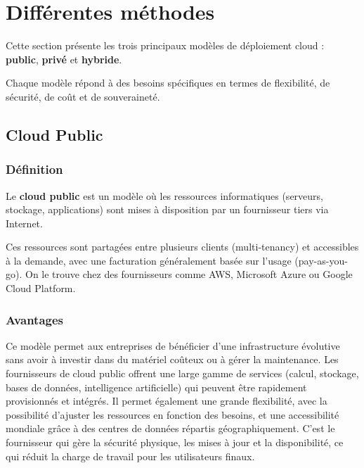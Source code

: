 \documentclass{report} %
\begin{document}
\section{Différentes méthodes}

Cette section présente les trois principaux modèles de déploiement
cloud : \textbf{public}, \textbf{privé} et \textbf{hybride}.

Chaque modèle répond à des besoins spécifiques en termes de
flexibilité, de sécurité, de coût et de souveraineté.

\subsection{Cloud Public}

\subsubsection{Définition}
Le \textbf{cloud public} est un modèle où les ressources informatiques
(serveurs, stockage, applications) sont mises à disposition par un
fournisseur tiers via Internet.

Ces ressources sont partagées entre plusieurs clients (multi-tenancy)
et accessibles à la demande, avec une facturation généralement basée
sur l’usage (pay-as-you-go).
On le trouve chez des fournisseurs comme AWS, Microsoft Azure ou Google Cloud Platform.


  
\subsubsection{Avantages}
Ce modèle permet aux entreprises de bénéficier d’une infrastructure évolutive sans avoir à investir dans du matériel coûteux ou à gérer la maintenance. 
Les fournisseurs de cloud public offrent une large gamme de services (calcul, stockage, bases de données, 
intelligence artificielle) qui peuvent être rapidement provisionnés et intégrés.
Il permet également une grande flexibilité, avec la possibilité d’ajuster les ressources en fonction des besoins, 
et une accessibilité mondiale grâce à des centres de données répartis géographiquement.
C'est le fournisseur qui gère la sécurité physique, les mises à jour et la disponibilité, ce qui réduit la charge de travail pour les utilisateurs finaux.
\end{document}
